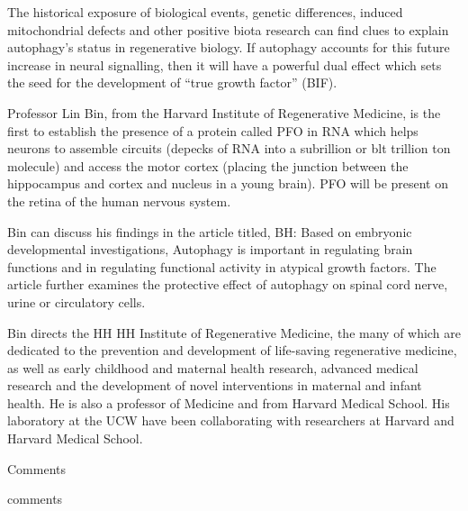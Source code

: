 \documentclass{article}
\begin{document}
The historical exposure of biological events, genetic differences, induced mitochondrial defects and other positive biota research can find clues to explain autophagy’s status in regenerative biology. If autophagy accounts for this future increase in neural signalling, then it will have a powerful dual effect which sets the seed for the development of “true growth factor” (BIF).

Professor Lin Bin, from the Harvard Institute of Regenerative Medicine, is the first to establish the presence of a protein called PFO in RNA which helps neurons to assemble circuits (depecks of RNA into a subrillion or blt trillion ton molecule) and access the motor cortex (placing the junction between the hippocampus and cortex and nucleus in a young brain). PFO will be present on the retina of the human nervous system.

Bin can discuss his findings in the article titled, BH: Based on embryonic developmental investigations, Autophagy is important in regulating brain functions and in regulating functional activity in atypical growth factors. The article further examines the protective effect of autophagy on spinal cord nerve, urine or circulatory cells.

Bin directs the HH HH Institute of Regenerative Medicine, the many of which are dedicated to the prevention and development of life-saving regenerative medicine, as well as early childhood and maternal health research, advanced medical research and the development of novel interventions in maternal and infant health. He is also a professor of Medicine and from Harvard Medical School. His laboratory at the UCW have been collaborating with researchers at Harvard and Harvard Medical School.

Comments

comments
\end{document}
